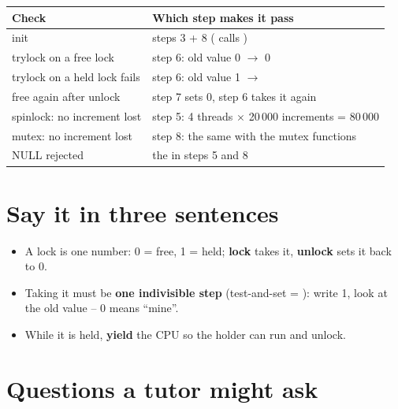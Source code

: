 \documentclass[11pt]{report}
\begin{document}
{\small
\begin{tabular}{@{}L{6.4cm} L{8.8cm}@{}}
\toprule
\textbf{Check} & \textbf{Which step makes it pass}\\\midrule
init & steps 3 + 8 ( calls )\\
trylock on a free lock & step 6: old value 0 $\to$ 0\\
trylock on a held lock fails & step 6: old value 1 $\to$ \\
free again after unlock & step 7 sets 0, step 6 takes it again\\
spinlock: no increment lost & step 5: 4 threads $\times$ 20\,000 increments = 80\,000\\
mutex: no increment lost & step 8: the same with the mutex functions\\
NULL rejected & the  in steps 5 and 8\\
\bottomrule
\end{tabular}}

\section*{Say it in three sentences}

\begin{keybox}[title={Remember}]
\begin{itemize}
  \item A lock is one number: 0 = free, 1 = held; \textbf{lock} takes it, \textbf{unlock} sets it back to 0.
  \item Taking it must be \textbf{one indivisible step} (test-and-set = ): write 1, look at the
        old value -- 0 means ``mine''.
  \item While it is held, \textbf{yield} the CPU so the holder can run and unlock.
\end{itemize}
\end{keybox}

\section*{Questions a tutor might ask}
\end{document}
